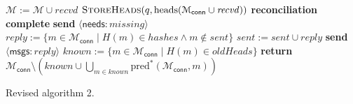 \documentclass[a4paper,anonymous,USenglish]{lipics-v2019}
\begin{document}
\begin{algorithm}[p]
\begin{algorithmic}[1]
            \State $\mathcal{M} := \mathcal{M} \cup \mathit{recvd}$ \label{line:update-m3}
            \State $\textsc{StoreHeads}(q, \mathrm{heads}(\mathcal{M}_\mathsf{conn} \cup \mathit{recvd}))$
            \State \textbf{reconciliation complete}
        \Else
            \State \textbf{send} $\langle\mathsf{needs}: \mathit{missing}\rangle$ \label{line:send-missing3}
        \EndIf
    \EndOn
    \State
     \label{line:recv-needs3}
        \State $\mathit{reply} := \{m \in \mathcal{M}_\mathsf{conn} \mid H(m) \in \mathit{hashes} \wedge m \notin \mathit{sent}\}$ \label{line:needs-reply3}
        \State $\mathit{sent} := \mathit{sent} \cup \mathit{reply}$
        \State \textbf{send} $\langle\mathsf{msgs}: \mathit{reply}\rangle$ \label{line:send-msgs3}
    \EndOn\label{line:end-needs3}
    \State
        \State $\mathit{known} := \{m \in \mathcal{M}_\mathsf{conn} \mid H(m) \in \mathit{oldHeads}\}$
        \State \textbf{return} $\mathcal{M}_\mathsf{conn} \setminus \left(\mathit{known} \cup \bigcup_{m \in \mathit{known}} \mathrm{pred}^*(\mathcal{M}_\mathsf{conn}, m)\right)$
    \EndFunction
    \end{algorithmic}
    \caption{Revised algorithm 2.}
\end{algorithm}
\end{document}
